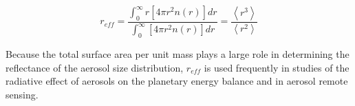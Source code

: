 \documentclass[12pt]{article}
\begin{document}
\begin{equation}
  \label{eq:reff}
  r_{eff}= \frac{\int_0^\infty r \left [ 4\pi  r^2 n(r) \right ] dr}%
              {\int_0^\infty  \left [ 4\pi  r^2 n(r) \right ] dr}
       = \frac{\left < r^3 \right >}{\left < r^2 \right >}
\end{equation}

Because the total surface area per unit mass plays a large role in determining the reflectance
of the aerosol size distribution, $r_{eff}$ is used frequently in studies of
the radiative effect of aerosols on the planetary energy balance and in aerosol remote sensing.
\end{document}
